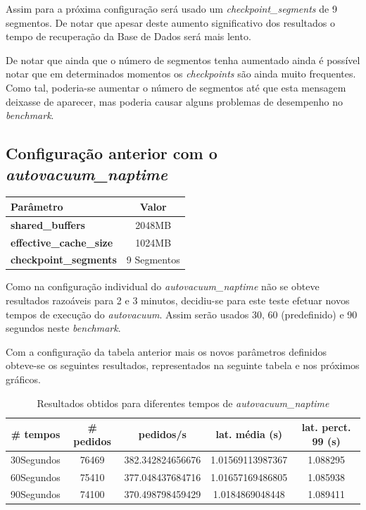Assim para a próxima configuração será usado um \textit{checkpoint\_segments} de 9 segmentos. De notar que apesar deste aumento significativo dos resultados o tempo de recuperação da Base de Dados será mais lento.

De notar que ainda que o número de segmentos tenha aumentado ainda é possível notar que em determinados momentos os \textit{checkpoints} são ainda muito frequentes. Como tal, poderia-se aumentar o número de segmentos até que esta mensagem deixasse de aparecer, mas poderia causar alguns problemas de desempenho no \textit{benchmark}.

\newpage

\subsection{Configuração anterior com o \textit{autovacuum\_naptime}}

\begin{table}[!h]
\center
\small
\begin{tabular}{|l|c|}
\hline
\textbf{Parâmetro} & \textbf{Valor} \\ \hline
\textbf{shared\_buffers} & 2048MB  \\ \hline
\textbf{effective\_cache\_size} & 1024MB  \\ \hline
\textbf{checkpoint\_segments} & 9 Segmentos \\ \hline
\end{tabular}
\end{table}

Como na configuração individual do \textit{autovacuum\_naptime} não se obteve resultados razoáveis para 2 e 3 minutos, decidiu-se para este teste efetuar novos tempos de execução do \textit{autovacuum}. Assim serão usados 30, 60 (predefinido) e 90 segundos neste \textit{benchmark}.

Com a configuração da tabela anterior mais os novos parâmetros definidos obteve-se os seguintes resultados, representados na seguinte tabela e nos próximos gráficos.

\begin{table}[!h]
\center
\small
\begin{tabular}{|c|c|c|c|c|}
\hline
\textbf{\# tempos} & \textbf{\# pedidos} & \textbf{pedidos/s} & \textbf{lat. média (s)} & \textbf{lat. perct. 99 (s)}  \\ \hline
30Segundos & 76469 & 382.342824656676 & 1.01569113987367 & 1.088295  \\ \hline
60Segundos & 75410 & 377.048437684716 & 1.01657169486805 & 1.085938  \\ \hline
90Segundos & 74100 & 370.498798459429 & 1.0184869048448 & 1.089411  \\ \hline
\end{tabular}
\caption{Resultados obtidos para diferentes tempos de \textit{autovacuum\_naptime}}
\end{table}

